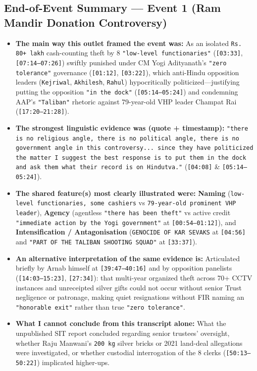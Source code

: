 \documentclass[10pt,a4paper]{article}
\begin{document}
\subsection*{End-of-Event Summary --- Event 1 (Ram Mandir Donation Controversy)}
\begin{itemize}[leftmargin=1.5em, itemsep=3pt, topsep=4pt]
  \item \textbf{The main way this outlet framed the event was:} As an isolated \texttt{Rs.\,80+ lakh} cash-counting theft by 8 \texttt{"low-level functionaries"} (\texttt{[03:33]}, \texttt{[07:14--07:26]}) swiftly punished under CM Yogi Adityanath's \texttt{"zero tolerance"} governance (\texttt{[01:12]}, \texttt{[03:22]}), which anti-Hindu opposition leaders (\texttt{Kejriwal}, \texttt{Akhilesh}, \texttt{Rahul}) hypocritically politicized---justifying putting the opposition \texttt{"in the dock"} (\texttt{[05:14--05:24]}) and condemning AAP's \texttt{"Taliban"} rhetoric against 79-year-old VHP leader Champat Rai (\texttt{[17:20--21:28]}).
  \item \textbf{The strongest linguistic evidence was (quote + timestamp):} \texttt{"there is no religious angle, there is no political angle, there is no government angle in this controversy... since they have politicized the matter I suggest the best response is to put them in the dock and ask them what their record is on Hindutva."} (\texttt{[04:08]} \& \texttt{[05:14--05:24]}).
  \item \textbf{The shared feature(s) most clearly illustrated were:} \textbf{Naming} (\texttt{low-level functionaries, some cashiers} vs \texttt{79-year-old prominent VHP leader}), \textbf{Agency} (agentless \texttt{"there has been theft"} vs active credit \texttt{"immediate action by the Yogi government"} at \texttt{[00:54--01:12]}), and \textbf{Intensification / Antagonisation} (\texttt{GENOCIDE OF KAR SEVAKS} at \texttt{[04:56]} and \texttt{"PART OF THE TALIBAN SHOOTING SQUAD"} at \texttt{[33:37]}).
  \item \textbf{An alternative interpretation of the same evidence is:} Articulated briefly by Arnab himself at \texttt{[39:47--40:16]} and by opposition panelists (\texttt{[14:03--15:23]}, \texttt{[27:34]}): that multi-year organized theft across 70+ CCTV instances and unreceipted silver gifts could not occur without senior Trust negligence or patronage, making quiet resignations without FIR naming an \texttt{"honorable exit"} rather than true \texttt{"zero tolerance"}.
  \item \textbf{What I cannot conclude from this transcript alone:} What the unpublished SIT report concluded regarding senior trustees' oversight, whether Raju Manwani's \texttt{200 kg} silver bricks or 2021 land-deal allegations were investigated, or whether custodial interrogation of the 8 clerks (\texttt{[50:13--50:22]}) implicated higher-ups.
\end{itemize}
\end{document}
